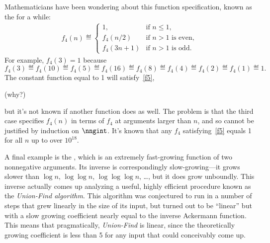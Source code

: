 Mathematicians have been wondering about this function specification, 
known as the  for a while:
\begin{eqnarray}\label{f5}
f_4(n) \eqdef\begin{cases}
 1, & \text{if $n\le 1$},\\
 f_4(n/2) &  \text{if $n>1$ is even},\\
 f_4(3n+1)& \text{if $n>1$ is odd}.
\end{cases}
\end{eqnarray}
For example, $f_4(3)=1$ because
\[
f_4(3)\eqdef f_4(10)\eqdef f_4(5)\eqdef f_4(16)\eqdef f_4(8)\eqdef
f_4(4)\eqdef f_4(2)\eqdef f_4(1)\eqdef 1.
\]
The constant function equal to 1 will satisfy~\eqref{f5}, 
\begin{editingnotes}
(why?)
\end{editingnotes}
but it's not known if another function does as well.  The problem is that the third case
specifies $f_4(n)$ in terms of $f_4$ at arguments larger than $n$, and so
cannot be justified by induction on $\nngint$.  It's known that any
$f_4$ satisfying~\eqref{f5} equals 1 for all $n$ up to over $10^{18}$.

\iffalse
\textbf{Quick exercise:} Why does the constant function 1
satisfy~\eqref{f5}?
\fi

A final example is the , which is an extremely
fast-growing function of two nonnegative arguments.  Its inverse is
correspondingly slow-growing---it grows slower than $\log n$, $\log \log
n$, $\log \log \log n$, \dots, but it does grow unboundly.  This inverse
actually comes up analyzing a useful, highly efficient procedure known as
the \emph{Union-Find algorithm}.  This algorithm was conjectured to run in
a number of steps that grew linearly in the size of its input, but turned
out to be ``linear'' but with a slow growing coefficient nearly equal to
the inverse Ackermann function.  This means that pragmatically,
\emph{Union-Find} is linear, since the theoretically growing coefficient is
less than 5 for any input that could conceivably come up.

\iffalse
You will learn about Union-Find if you take the Algorithms course, 6.046.
We're mentioning this story to motivate an examination of the somewhat
unusual recursive definition of Ackermann's function $A(m,n)$.
\fi

